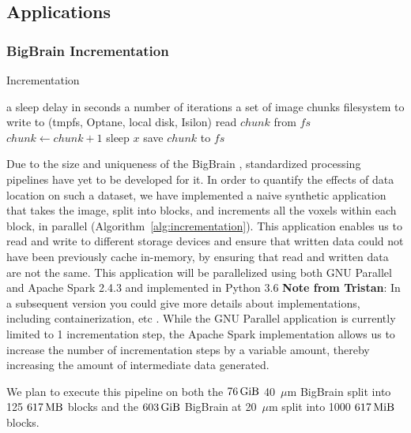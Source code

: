 \documentclass[conference]{IEEEtran}
\newcommand{\Desc}[2]{\State \makebox[2em][l]{#1}#2}
\newcommand{\bigbrain}{BigBrain }
\newcommand{\tristan}[1]{\color{orange}\textbf{Note from Tristan}:
      #1 \color{black}}
\begin{document}
\subsection{Applications}
\subsubsection{ \bigbrain Incrementation}

\begin{algorithm}\caption{Incrementation}\label{alg:incrementation}
    \begin{algorithmic}[1]
    \Input
        \Desc{$x$}{a sleep delay in seconds}
        \Desc{$n$}{a number of iterations}
        \Desc{$C$}{a set of image chunks}
        \Desc{$fs$}{filesystem to write to (tmpfs, Optane, local disk, Isilon)}
    \EndInput
        \State read $chunk$ from $fs$
            \State $chunk\gets chunk+1$
            \State sleep $x$
        \EndFor
        \State save $chunk$ to $fs$
    \EndFor
    \end{algorithmic}
\end{algorithm}  

Due to the size and uniqueness of the \bigbrain, standardized processing pipelines
have yet to be developed for it. In order to quantify the effects of data location
on such a dataset, we have implemented a naive synthetic application that takes 
the image, split into blocks, and increments all the voxels within each block, in parallel (Algorithm~\ref{alg:incrementation}).
This application
enables us to read and write to different storage devices and ensure that written
data could not have been previously cache
in-memory, by ensuring that read and written data are not the same. This application
will be parallelized using both GNU Parallel and Apache Spark 2.4.3 and implemented in Python 3.6 \tristan{In a subsequent 
version you could give more details about implementations, including containerization, etc}. While the GNU Parallel application
is currently limited to 1 incrementation step, the Apache Spark implementation allows us to increase
the number of incrementation steps by a variable amount, thereby increasing the amount of intermediate
data generated.

We plan to execute this pipeline on both the $\SI{76}{\gibi\byte}$ 40~$\mu$m 
\bigbrain split into 125 $\SI{617}{\mega\byte}$ blocks and the $\SI{603}{\gibi\byte}$
\bigbrain at 20~$\mu$m split into 1000 $\SI{617}{\mebi\byte}$ blocks.
\end{document}

